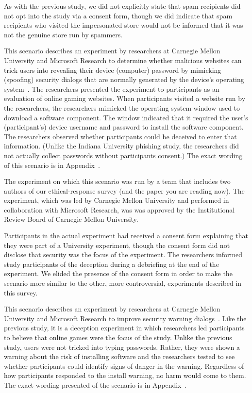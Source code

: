 As with the previous study, we did not explicitly state that spam recipients did not opt into the study via a consent form, though we did indicate that spam recipients who visited the impersonated store would not be informed that it was not the genuine store run by spammers.

This scenario describes an experiment by researchers at Carnegie Mellon University and Microsoft Research to determine whether malicious websites can trick users into revealing their device (computer) password by mimicking (spoofing) security dialogs that are normally generated by the device's operating system~\cite{BravoLillo2012:MistakenIdentity}.  The researchers presented the experiment to participants as an evaluation of online gaming websites.  When participants visited a website run by the researchers, the researchers mimicked the operating system window used to download a software component.  The window indicated that it required the user's (participant's) device username and password to install the software component.  The researchers observed whether participants could be deceived to enter that information.  (Unlike the Indiana University phishing study, the researchers did not actually collect passwords without participants consent.)  The exact wording of this scenario is in Appendix~.

The experiment on which this scenario was run by a team that includes two authors of our ethical-response survey (and the paper you are reading now).  The experiment, which was led by Carnegie Mellon University and performed in collaboration with Microsoft Research, was was approved by the Institutional Review Board of Carnegie Mellon University.

Participants in the actual experiment had received a consent form explaining that they were part of a University experiment, though the consent form did not disclose that security was the focus of the experiment.  The researchers informed study participants of the deception during a debriefing at the end of the experiment.  We elided the presence of the consent form in order to make the scenario more similar to the other, more controversial, experiments described in this survey.

This scenario describes an experiment by researchers at Carnegie Mellon University and Microsoft Research to improve security warning dialogs~\cite{BravoLillo2013:Attention}.  Like the previous study, it is a deception experiment in which researchers led participants to believe that online games were the focus of the study.  Unlike the previous study, users were not tricked into typing passwords.  Rather, they were shown a warning about the risk of installing software and the researchers tested to see whether participants could identify signs of danger in the warning.  Regardless of how participants responded to the install warning, no harm would come to them.  The exact wording presented of the scenario is in Appendix~.

